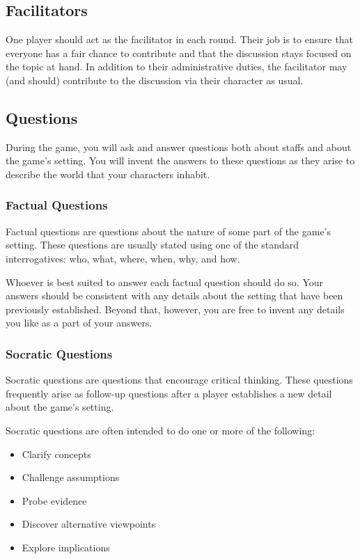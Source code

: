 \documentclass[a6paper, 11pt, parskip=half]{scrartcl}
\begin{document}
\subsection*{Facilitators}
One player should act as the facilitator in each round. Their job is to ensure that everyone has a fair chance to contribute and that the discussion stays focused on the topic at hand. In addition to their administrative duties, the facilitator may (and should) contribute to the discussion via their character as usual. 
\newpage

\subsection*{Questions}
During the game, you will ask and answer questions both about staffs and about the game's setting.
You will invent the answers to these questions as they arise to describe the world that your characters inhabit.

\subsubsection*{Factual Questions}

Factual questions are questions about the nature of some part of the game's setting.
These questions are usually stated using one of the standard interrogatives: who, what, where, when, why, and how.

Whoever is best suited to answer each factual question should do so.
Your answers should be consistent with any details about the setting that have been previously established.
Beyond that, however, you are free to invent any details you like as a part of your answers.

\subsubsection*{Socratic Questions}
Socratic questions are questions that encourage critical thinking.
These questions frequently arise as follow-up questions after a player establishes a new detail about the game's setting.

Socratic questions are often intended to do one or more of the following:
\begin{itemize}[nosep]
	\item Clarify concepts
	\item Challenge assumptions
	\item Probe evidence
	\item Discover alternative viewpoints
	\item Explore implications
\end{itemize}
\end{document}
